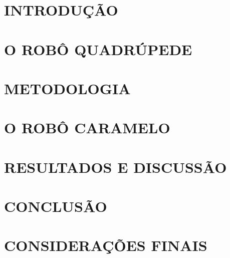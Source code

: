 \documentclass[a4paper, 12pt, twocolumn]{article}
\begin{document}
    

    \section{\MakeUppercase{Introdução}}
    

    \section{\MakeUppercase{O robô quadrúpede}}
    

    \section{\MakeUppercase{Metodologia}} 
    

    \section{\MakeUppercase{O robô Caramelo}} 
    

    \section{\MakeUppercase{Resultados e Discussão}}
    

    \section{\MakeUppercase{Conclusão}}
    

    \section{\MakeUppercase{Considerações finais}}
    

    
    
\end{document}

